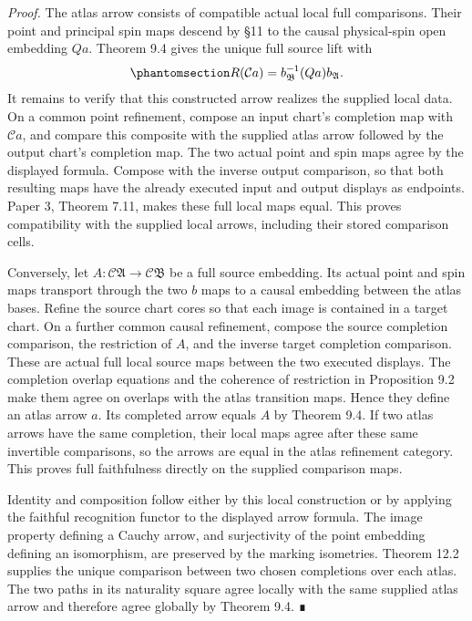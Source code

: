 \documentclass[
  english,
  11pt,
  reqno]{amsart}
\begin{document}
\emph{Proof.} The atlas arrow consists of compatible actual local full
comparisons. Their point and principal spin maps descend by §11 to the
causal physical-spin open embedding \(Q a\). Theorem 9.4 gives the
unique full source lift with
\begin{equation}\protect\phantomsection\label{eq:ordinary-atlas-completed-arrow-readout}{
R(\mathcal C a)
=b_{\mathfrak B}^{-1}(Q a)b_{\mathfrak A}.
}\end{equation} It remains to verify that this constructed arrow
realizes the supplied local data. On a common point refinement, compose
an input chart's completion map with \(\mathcal C a\), and compare this
composite with the supplied atlas arrow followed by the output chart's
completion map. The two actual point and spin maps agree by the
displayed formula. Compose with the inverse output comparison, so that
both resulting maps have the already executed input and output displays
as endpoints. Paper 3, Theorem 7.11, makes these full local maps equal.
This proves compatibility with the supplied local arrows, including
their stored comparison cells.

Conversely, let \(A:\mathcal C\mathfrak A\to\mathcal C\mathfrak B\) be a
full source embedding. Its actual point and spin maps transport through
the two \(b\) maps to a causal embedding between the atlas bases. Refine
the source chart cores so that each image is contained in a target
chart. On a further common causal refinement, compose the source
completion comparison, the restriction of \(A\), and the inverse target
completion comparison. These are actual full local source maps between
the two executed displays. The completion overlap equations and the
coherence of restriction in Proposition 9.2 make them agree on overlaps
with the atlas transition maps. Hence they define an atlas arrow \(a\).
Its completed arrow equals \(A\) by Theorem 9.4. If two atlas arrows
have the same completion, their local maps agree after these same
invertible comparisons, so the arrows are equal in the atlas refinement
category. This proves full faithfulness directly on the supplied
comparison maps.

Identity and composition follow either by this local construction or by
applying the faithful recognition functor to the displayed arrow
formula. The image property defining a Cauchy arrow, and surjectivity of
the point embedding defining an isomorphism, are preserved by the
marking isometries. Theorem 12.2 supplies the unique comparison between
two chosen completions over each atlas. The two paths in its naturality
square agree locally with the same supplied atlas arrow and therefore
agree globally by Theorem 9.4. ∎
\end{document}
